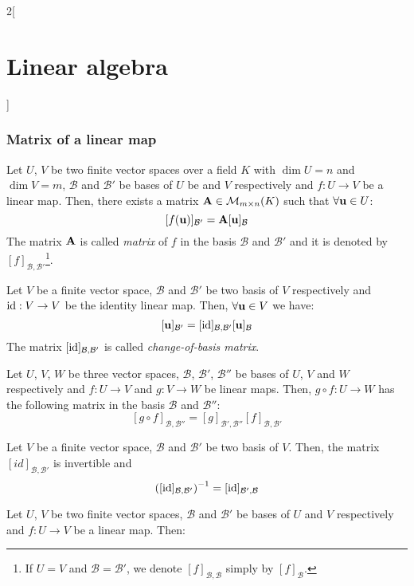 \documentclass[../../../main.tex]{subfiles}
\begin{document}
\begin{multicols}{2}[\section{Linear algebra}]
  \subsubsection{Matrix of a linear map}
  \begin{proposition}
    Let $U$, $V$ be two finite vector spaces over a field $K$ with $\dim U=n$ and $\dim V=m$, $\mathcal{B}$ and $\mathcal{B}'$ be bases of $U$ be and $V$ respectively and $f:U\rightarrow V$ be a linear map. Then, there exists a matrix $\boldsymbol{\mathrm{A}}\in\mathcal{M}_{m\times n}(K)$ such that $\forall\boldsymbol{\mathrm{u}}\in U$: $$[f(\boldsymbol{\mathrm{u}})]_{\mathcal{B}'}=\boldsymbol{\mathrm{A}}[\boldsymbol{\mathrm{u}}]_\mathcal{B}$$
    The matrix $\boldsymbol{\mathrm{A}}$ is called \emph{matrix} of $f$ in the basis $\mathcal{B}$ and $\mathcal{B}'$ and it is denoted by $[f]_{\mathcal{B},\mathcal{B}'}$\footnote{If $U=V$ and $\mathcal{B}=\mathcal{B}'$, we denote $[f]_{\mathcal{B},\mathcal{B}}$ simply by $[f]_{\mathcal{B}}$.}.
  \end{proposition}
  \begin{corollary}
    Let $V$ be a finite vector space, $\mathcal{B}$ and $\mathcal{B}'$ be two basis of $V$ respectively and $\mathrm{id}:V\rightarrow V$ be the identity linear map. Then, $\forall\boldsymbol{\mathrm{u}}\in V$ we have: $$[\boldsymbol{\mathrm{u}}]_{\mathcal{B}'}=[\mathrm{id}]_{\mathcal{B},\mathcal{B}'}[\boldsymbol{\mathrm{u}}]_\mathcal{B}$$ The matrix $[\mathrm{id}]_{\mathcal{B},\mathcal{B}'}$ is called \emph{change-of-basis matrix}.
  \end{corollary}
  \begin{proposition}
    Let $U$, $V$, $W$ be three vector spaces, $\mathcal{B}$, $\mathcal{B}'$, $\mathcal{B}''$ be bases of $U$, $V$ and $W$ respectively and $f:U\rightarrow V$ and $g:V\rightarrow W$ be linear maps. Then, $g\circ f:U\rightarrow W$ has the following matrix in the basis $\mathcal{B}$ and $\mathcal{B}''$: $$[g\circ f]_{\mathcal{B},\mathcal{B}''}=[g]_{\mathcal{B}',\mathcal{B}''}[f]_{\mathcal{B},\mathcal{B}'}$$
  \end{proposition}
  \begin{corollary}
    Let $V$ be a finite vector space, $\mathcal{B}$ and $\mathcal{B}'$ be two basis of $V$. Then, the matrix $[id]_{\mathcal{B},\mathcal{B}'}$ is invertible and $${\left([\mathrm{id}]_{\mathcal{B},\mathcal{B}'}\right)}^{-1}=[\mathrm{id}]_{\mathcal{B}',\mathcal{B}}$$
  \end{corollary}
  \begin{corollary}
    Let $U$, $V$ be two finite vector spaces, $\mathcal{B}$ and $\mathcal{B}'$ be bases of $U$ and $V$ respectively and $f:U\rightarrow V$ be a linear map. Then:
    \begin{enumerate}

\end{enumerate}
\end{corollary}
\end{multicols}
\end{document}

